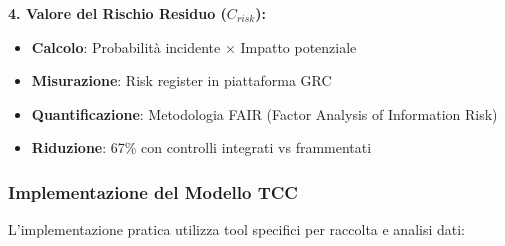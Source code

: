 \textbf{4. Valore del Rischio Residuo ($C_{risk}$):}
\begin{itemize}
    \item \textbf{Calcolo}: Probabilità incidente × Impatto potenziale
    \item \textbf{Misurazione}: Risk register in piattaforma GRC
    \item \textbf{Quantificazione}: Metodologia FAIR (Factor Analysis of Information Risk)
    \item \textbf{Riduzione}: 67\% con controlli integrati vs frammentati
\end{itemize}

\subsubsection{Implementazione del Modello TCC}

L'implementazione pratica utilizza tool specifici per raccolta e analisi dati:

